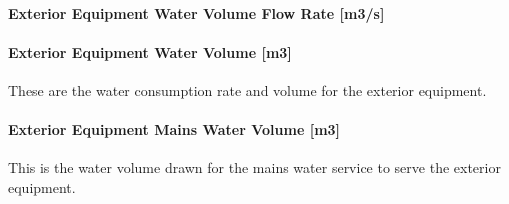 \paragraph{Exterior Equipment Water Volume Flow Rate {[}m3/s{]}}\label{exterior-equipment-water-volume-flow-rate-m3s}

\paragraph{Exterior Equipment Water Volume {[}m3{]}}\label{exterior-equipment-water-volume-m3}

These are the water consumption rate and volume for the exterior equipment.

\paragraph{Exterior Equipment Mains Water Volume {[}m3{]}}\label{exterior-equipment-mains-water-volume-m3}

This is the water volume drawn for the mains water service to serve the exterior equipment.
